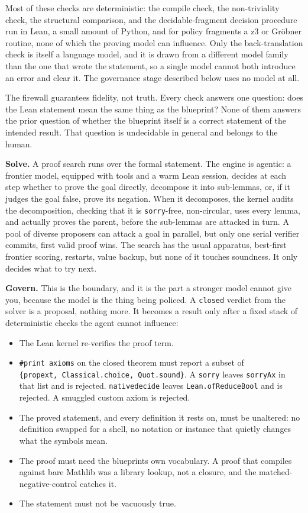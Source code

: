 \documentclass[
  11pt,
]{article}
\providecommand{\tightlist}{%
  \setlength{\itemsep}{0pt}\setlength{\parskip}{0pt}}
\renewcommand{\_}{\origunderscore\allowbreak}
\begin{document}
Most of these checks are deterministic: the compile check, the
non-triviality check, the structural comparison, and the
decidable-fragment decision procedure run in Lean, a small amount of
Python, and for policy fragments a z3 or Gröbner routine, none of which
the proving model can influence. Only the back-translation check is
itself a language model, and it is drawn from a different model family
than the one that wrote the statement, so a single model cannot both
introduce an error and clear it. The governance stage described below
uses no model at all.

The firewall guarantees fidelity, not truth. Every check answers one
question: does the Lean statement mean the same thing as the blueprint?
None of them answers the prior question of whether the blueprint itself
is a correct statement of the intended result. That question is
undecidable in general and belongs to the human.

\textbf{Solve.} A proof search runs over the formal statement. The
engine is agentic: a frontier model, equipped with tools and a warm Lean
session, decides at each step whether to prove the goal directly,
decompose it into sub-lemmas, or, if it judges the goal false, prove its
negation. When it decomposes, the kernel audits the decomposition,
checking that it is \texttt{sorry}-free, non-circular, uses every lemma,
and actually proves the parent, before the sub-lemmas are attacked in
turn. A pool of diverse proposers can attack a goal in parallel, but
only one serial verifier commits, first valid proof wins. The search has
the usual apparatus, best-first frontier scoring, restarts, value
backup, but none of it touches soundness. It only decides what to try
next.

\textbf{Govern.} This is the boundary, and it is the part a stronger
model cannot give you, because the model is the thing being policed. A
\texttt{closed} verdict from the solver is a proposal, nothing more. It
becomes a result only after a fixed stack of deterministic checks the
agent cannot influence:

\begin{itemize}
\tightlist
\item
  The Lean kernel re-verifies the proof term.
\item
  \texttt{\#print\ axioms} on the closed theorem must report a subset of
  \texttt{\{propext,\ Classical.choice,\ Quot.sound\}}. A \texttt{sorry}
  leaves \texttt{sorryAx} in that list and is rejected.
  \texttt{native\_decide} leaves \texttt{Lean.ofReduceBool} and is
  rejected. A smuggled custom axiom is rejected.
\item
  The proved statement, and every definition it rests on, must be
  unaltered: no definition swapped for a shell, no notation or instance
  that quietly changes what the symbols mean.
\item
  The proof must need the blueprint\textquotesingle s own vocabulary. A
  proof that compiles against bare Mathlib was a library lookup, not a
  closure, and the matched-negative-control catches it.
\item
  The statement must not be vacuously true.
\end{itemize}
\end{document}
